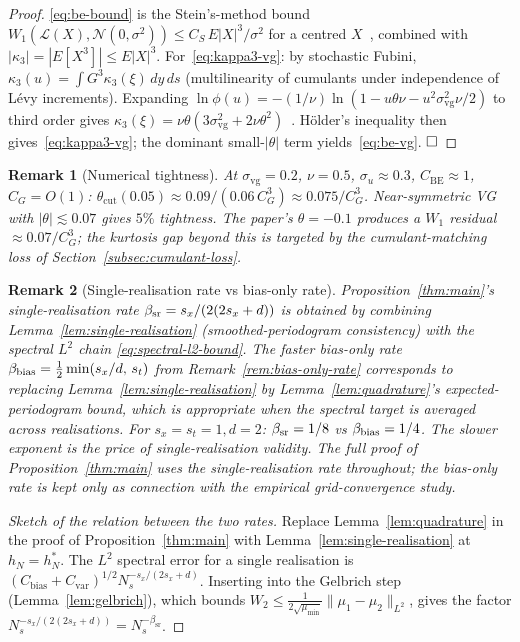 \documentclass[review,12pt]{elsarticle}
\newtheorem{remark}{Remark}
\begin{document}
\begin{proof}
\eqref{eq:be-bound} is the Stein's-method bound
$W_1(\mathcal{L}(X),\mathcal{N}(0,\sigma^2))\le C_S\,E|X|^3/\sigma^2$
for a centred $X$~\cite[Thm.~3.1]{ChenGoldsteinShao2011},
combined with $|\kappa_3|=|E[X^3]|\le E|X|^3$.
For~\eqref{eq:kappa3-vg}: by stochastic Fubini,
$\kappa_3(u)=\int G^3\kappa_3(\xi)\,dy\,ds$
(multilinearity of cumulants under independence of Lévy increments).
Expanding $\ln\phi(u)=-(1/\nu)\ln(1-u\theta\nu-u^2\sigma_{\mathrm{vg}}^2\nu/2)$
to third order gives $\kappa_3(\xi)=\nu\theta(3\sigma_{\mathrm{vg}}^2+2\nu\theta^2)$~\cite{ContTankov2003,MadanCarrChang1998}.
H\"older's inequality then gives~\eqref{eq:kappa3-vg}; the dominant small-$|\theta|$
term yields~\eqref{eq:be-vg}.
$\hfill\square$
\end{proof}

\begin{remark}[Numerical tightness]
\label{rem:be-numerical}
At $\sigma_{\mathrm{vg}}=0.2$, $\nu=0.5$, $\sigma_u\approx 0.3$,
$C_{\mathrm{BE}}\approx 1$, $C_G=O(1)$:
$\theta_{\mathrm{cut}}(0.05)
\approx 0.09/(0.06\,C_G^3)
\approx 0.075/C_G^3$.
Near-symmetric VG with $|\theta|\lesssim 0.07$ gives $5\%$ tightness.
The paper's $\theta=-0.1$ produces a $W_1$ residual $\approx 0.07/C_G^3$;
the kurtosis gap beyond this is targeted by the cumulant-matching loss
of Section~\ref{subsec:cumulant-loss}.
\end{remark}

\begin{remark}[Single-realisation rate vs bias-only rate]
\label{cor:smoothed-loss}
Proposition~\ref{thm:main}'s single-realisation rate
$\beta_{\rm sr} = s_x/(2(2 s_x + d))$ is obtained by combining
Lemma~\ref{lem:single-realisation} (smoothed-periodogram
consistency) with the spectral $L^2$ chain
\eqref{eq:spectral-l2-bound}. The faster bias-only rate
$\beta_{\rm bias} = \tfrac12\min(s_x/d,\,s_t)$ from
Remark~\ref{rem:bias-only-rate}
corresponds to replacing Lemma~\ref{lem:single-realisation} by
Lemma~\ref{lem:quadrature}'s expected-periodogram bound, which is
appropriate when the spectral target is averaged across
realisations. For $s_x = s_t = 1, d = 2$: $\beta_{\rm sr} = 1/8$
vs $\beta_{\rm bias} = 1/4$. The slower exponent is the price of
single-realisation validity. The full proof of
Proposition~\ref{thm:main} uses the single-realisation rate
throughout; the bias-only rate is kept only as connection with the
empirical grid-convergence study.
\end{remark}

\begin{proof}[Sketch of the relation between the two rates]
Replace Lemma~\ref{lem:quadrature} in the proof of
Proposition~\ref{thm:main} with Lemma~\ref{lem:single-realisation}
at \(h_N = h_N^*\). The \(L^2\) spectral error for a single
realisation is
\((C_{\mathrm{bias}}+C_{\mathrm{var}})^{1/2} N_s^{-s_x/(2s_x+d)}\).
Inserting into the Gelbrich step (Lemma~\ref{lem:gelbrich}), which
bounds \(W_2 \le \tfrac{1}{2\sqrt{\mu_{\min}}}
\|\mu_1 - \mu_2\|_{L^2}\), gives the factor
\(N_s^{-s_x/(2(2s_x+d))} = N_s^{-\beta_{\mathrm{sr}}}\).
\end{proof}
\end{document}
